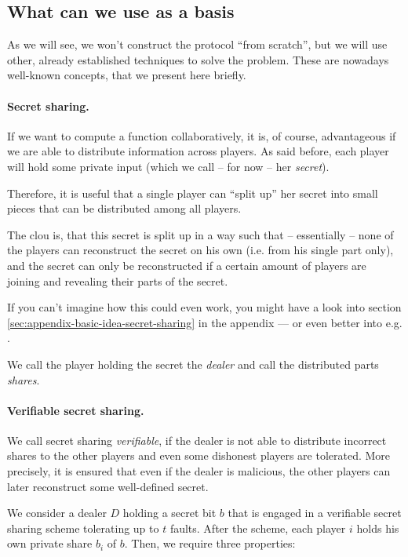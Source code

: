 \message{ !name(seminar.tex)}\documentclass{llncs}
\begin{document}
\subsection{What can we use as a basis}
\label{sec:building-blocks-for-the-protocol}

As we will see, we won't construct the protocol ``from scratch'', but we will use other, already established techniques to solve the problem. These are nowadays well-known concepts, that we present here briefly.

\paragraph{Secret sharing.}

If we want to compute a function collaboratively, it is, of course, advantageous if we are able to distribute information across players. As said before, each player will hold some private input (which we call -- for now -- her \emph{secret}).

Therefore, it is useful that a single player can ``split up'' her secret into small pieces that can be distributed among all players. 

The clou is, that this secret is split up in a way such that -- essentially -- none of the players can reconstruct the secret on his own (i.e. from his single part only), and the secret can only be reconstructed if a certain amount of players are joining and revealing their parts of the secret. 


If you can't imagine how this could even work, you might have a look into section \ref{sec:appendix-basic-idea-secret-sharing} in the appendix --- or even better into e.g. \cite{shamir_secret_sharing}.

We call the player holding the secret the \emph{dealer} and call the distributed parts \emph{shares}.

\paragraph{Verifiable secret sharing.}

We call secret sharing \emph{verifiable}, if the dealer is not able to distribute incorrect shares to the other players and even some dishonest players are tolerated. More precisely, it is ensured that even if the dealer is malicious, the other players can later reconstruct some well-defined secret.

We consider a dealer $D$ holding a secret bit $b$ that is engaged in a verifiable secret sharing scheme tolerating up to $t$ faults. After the scheme, each player $i$ holds his own private share $b_i$ of $b$. Then, we require three properties:
\end{document}
